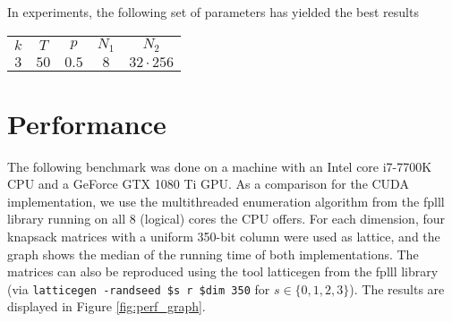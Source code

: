 \documentclass{scrartcl}
\begin{document}
    In experiments, the following set of parameters has yielded the best results
    
    \begin{center}
        \begin{tabular}[5]{c c c c c}
            $k$ & $T$ & $p$ & $N_1$ & $N_2$ \\
            $3$ & $50$ & $0.5$ & $8$ & $32 \cdot 256$
        \end{tabular}
    \end{center}

    \section{Performance}


    The following benchmark was done on a machine with an Intel core i7-7700K CPU and a GeForce GTX 1080 Ti GPU. As a comparison for the CUDA implementation, we use the multithreaded enumeration algorithm from the fplll library \cite{fplll} running on all 8 (logical) cores the CPU offers.
    For each dimension, four knapsack matrices with a uniform 350-bit column were used as lattice, and the graph shows the median of the running time of both implementations. The matrices can also be reproduced using the tool latticegen from the fplll library (via \texttt{latticegen -randseed \$s r \$dim 350} for $s \in \{0, 1, 2, 3\}$).
    The results are displayed in Figure \ref{fig:perf_graph}.
\end{document}
